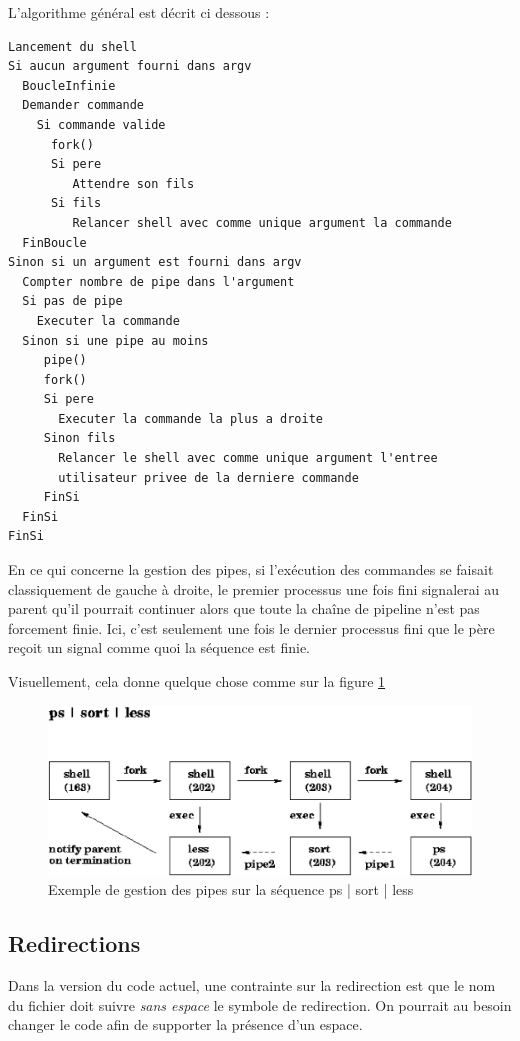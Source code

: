 \documentclass[fr]{article}
\begin{document}
L'algorithme général est décrit ci dessous : 
\begin{lstlisting}
Lancement du shell 
Si aucun argument fourni dans argv
  BoucleInfinie
  Demander commande
    Si commande valide
      fork() 
      Si pere 
         Attendre son fils
      Si fils 
         Relancer shell avec comme unique argument la commande
  FinBoucle
Sinon si un argument est fourni dans argv
  Compter nombre de pipe dans l'argument
  Si pas de pipe
    Executer la commande
  Sinon si une pipe au moins
     pipe()
     fork()
     Si pere
       Executer la commande la plus a droite
     Sinon fils
       Relancer le shell avec comme unique argument l'entree
       utilisateur privee de la derniere commande
     FinSi
  FinSi
FinSi
\end{lstlisting}

En ce qui concerne la gestion des pipes, si l'exécution des commandes se faisait classiquement de gauche à
droite, le premier processus une fois fini signalerai au parent qu'il
pourrait continuer alors que toute la chaîne de pipeline n'est pas
forcement finie. Ici, c'est seulement une fois le dernier processus
fini que le père reçoit un signal comme quoi la séquence est finie.


Visuellement, cela donne quelque chose comme sur la figure \ref{pipe} 
\begin{figure}[!h]
\centering
  \includegraphics[scale=0.5]{img/pipes}
  \caption{Exemple de gestion des pipes sur la séquence ps | sort | less}
\label{pipe}
\end{figure}


\subsection{Redirections}
Dans la version du code actuel, une contrainte sur la redirection est que le nom du fichier doit
suivre \emph{sans espace} le symbole de redirection. On pourrait
au besoin changer le code afin de supporter la présence d'un espace.
\end{document}
